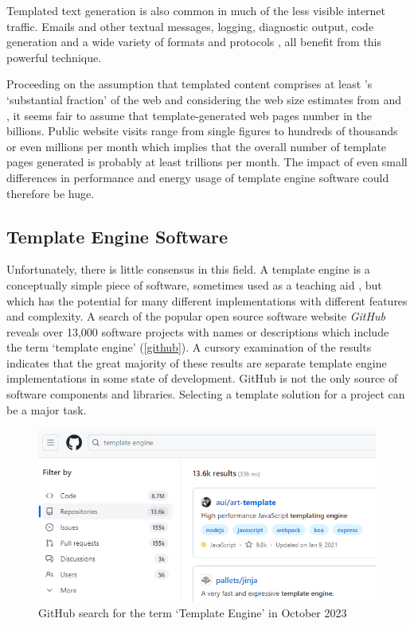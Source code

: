 Templated text generation is also common in much of the less visible internet traffic. Emails and other textual messages, logging, diagnostic output, code generation \citep{Fritzson2009} \citep{Arnoldus2010} and a wide variety of formats and protocols \citep{Barbosa2002}, all benefit from this powerful technique.

Proceeding on the assumption that templated content comprises at least \citeauthor{Yang2008}'s  `substantial fraction' of the web and considering the web size estimates from \citet{Worldwidewebsize2018} and \citet{Kunder2008}, it seems fair to assume that template-generated web pages number in the billions. Public website visits range from single figures to hundreds of thousands or even millions per month \citep{Castillo2023} which implies that the overall number of template pages generated is probably at least trillions per month. The impact of even small differences in performance and energy usage of template engine software could therefore be huge.

\subsection{Template Engine Software}

Unfortunately, there is little consensus in this field. A template engine is a conceptually simple piece of software, sometimes used as a teaching aid \citep{Koskela2007}, but which has the potential for many different implementations with different features and complexity. A search of the popular open source software website \emph{GitHub} \citep{GitHubGeneral} reveals over 13,000 software projects with names or descriptions which include the term `template engine' (\autoref{github}). A cursory examination of the results indicates that the great majority of these results are separate template engine implementations in some state of development. GitHub is not the only source of software components and libraries. Selecting a template solution for a project can be a major task.

\begin{figure}[ht!]
\centering
\includegraphics[width=\columnwidth]{Figures/template-engines-2023.png}
\caption{GitHub search for the term `Template Engine' in October 2023}
\label{github}
\end{figure}

